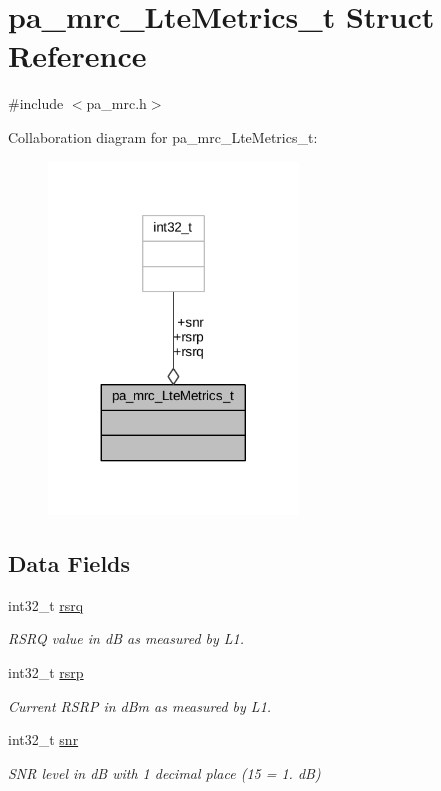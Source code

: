 \hypertarget{structpa__mrc___lte_metrics__t}{}\section{pa\+\_\+mrc\+\_\+\+Lte\+Metrics\+\_\+t Struct Reference}
\label{structpa__mrc___lte_metrics__t}


{\ttfamily \#include $<$pa\+\_\+mrc.\+h$>$}



Collaboration diagram for pa\+\_\+mrc\+\_\+\+Lte\+Metrics\+\_\+t\+:
\nopagebreak
\begin{figure}[H]
\begin{center}
\leavevmode
\includegraphics[width=188pt]{structpa__mrc___lte_metrics__t__coll__graph}
\end{center}
\end{figure}
\subsection*{Data Fields}
\begin{DoxyCompactItemize}
\item 
int32\+\_\+t \hyperlink{structpa__mrc___lte_metrics__t_a122cc447b6a6eb0d3e08ea6163cccaa8}{rsrq}
\begin{DoxyCompactList}\small\item\em R\+S\+RQ value in dB as measured by L1. \end{DoxyCompactList}\item 
int32\+\_\+t \hyperlink{structpa__mrc___lte_metrics__t_aebd9ffa2c98a684681b0e125bf8f7b35}{rsrp}
\begin{DoxyCompactList}\small\item\em Current R\+S\+RP in d\+Bm as measured by L1. \end{DoxyCompactList}\item 
int32\+\_\+t \hyperlink{structpa__mrc___lte_metrics__t_aee4c696609532fdd9b62df842bfe15fb}{snr}
\begin{DoxyCompactList}\small\item\em S\+NR level in dB with 1 decimal place (15 = 1. dB) \end{DoxyCompactList}\end{DoxyCompactItemize}


